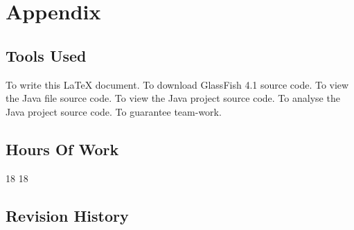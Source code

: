 \section{Appendix}

\subsection{Tools Used}
\begin{enumerate}
	 To write this \LaTeX{} document.
	 To download GlassFish 4.1 source code.
	 To view the Java file source code.
	 To view the Java project source code.
	 To analyse the Java project source code.
	 To guarantee team-work.
\end{enumerate}


\subsection{Hours Of Work}
\begin{itemize}
	 18
	 18
\end{itemize}

\subsection{Revision History}
